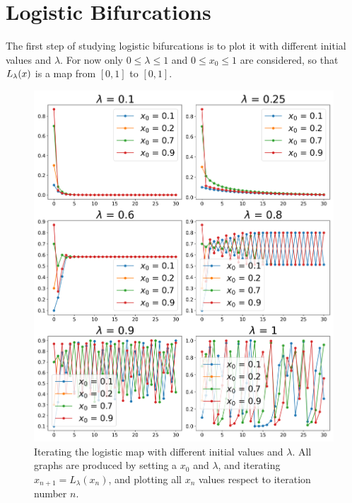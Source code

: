 

\section{Logistic Bifurcations}

The first step of studying logistic bifurcations is to plot it with different initial values and $\lambda$. 
For now only $0 \leq \lambda \leq 1$ and $0 \leq x_0 \leq 1$ are considered, so that $L_{\lambda}(x)$ is a map from $[0,1]$ to $[0,1]$. 

\begin{figure}[htbp]
	\centering
	\label{fig:various_iter_logistic}
	\includegraphics[width=\textwidth]{./figures/various_iterating_logistic_map.png}
	\caption{Iterating the logistic map with different initial values and $\lambda$. All graphs are produced by setting a $x_0$ and $\lambda$, and iterating $x_{n+1} = L_{\lambda}(x_n)$, and plotting all $x_n$ values respect to iteration number $n$.}
\end{figure}

